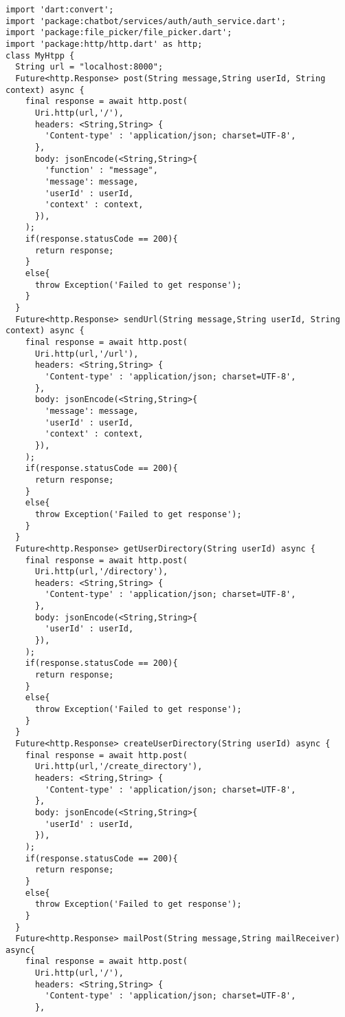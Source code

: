 \begin{lstlisting}[style=pythonstyle,caption={Codice del my\_http.dart}, label={lst:myHtpp}]
import 'dart:convert';
import 'package:chatbot/services/auth/auth_service.dart';
import 'package:file_picker/file_picker.dart';
import 'package:http/http.dart' as http;
class MyHtpp {
  String url = "localhost:8000";
  Future<http.Response> post(String message,String userId, String context) async {
    final response = await http.post(
      Uri.http(url,'/'),
      headers: <String,String> {
        'Content-type' : 'application/json; charset=UTF-8',
      },
      body: jsonEncode(<String,String>{
        'function' : "message",
        'message': message,
        'userId' : userId,
        'context' : context,
      }),
    );
    if(response.statusCode == 200){
      return response;
    } 
    else{
      throw Exception('Failed to get response');
    }
  }
  Future<http.Response> sendUrl(String message,String userId, String context) async {
    final response = await http.post(
      Uri.http(url,'/url'),
      headers: <String,String> {
        'Content-type' : 'application/json; charset=UTF-8',
      },
      body: jsonEncode(<String,String>{
        'message': message,
        'userId' : userId,
        'context' : context,
      }),
    );
    if(response.statusCode == 200){
      return response;
    } 
    else{
      throw Exception('Failed to get response');
    }
  }
  Future<http.Response> getUserDirectory(String userId) async {
    final response = await http.post(
      Uri.http(url,'/directory'),
      headers: <String,String> {
        'Content-type' : 'application/json; charset=UTF-8',
      },
      body: jsonEncode(<String,String>{
        'userId' : userId,
      }),
    );
    if(response.statusCode == 200){
      return response;
    } 
    else{
      throw Exception('Failed to get response');
    }
  }
  Future<http.Response> createUserDirectory(String userId) async {
    final response = await http.post(
      Uri.http(url,'/create_directory'),
      headers: <String,String> {
        'Content-type' : 'application/json; charset=UTF-8',
      },
      body: jsonEncode(<String,String>{
        'userId' : userId,
      }),
    );
    if(response.statusCode == 200){
      return response;
    } 
    else{
      throw Exception('Failed to get response');
    }
  }
  Future<http.Response> mailPost(String message,String mailReceiver) async{
    final response = await http.post(
      Uri.http(url,'/'),
      headers: <String,String> {
        'Content-type' : 'application/json; charset=UTF-8',
      },

\end{lstlisting}
